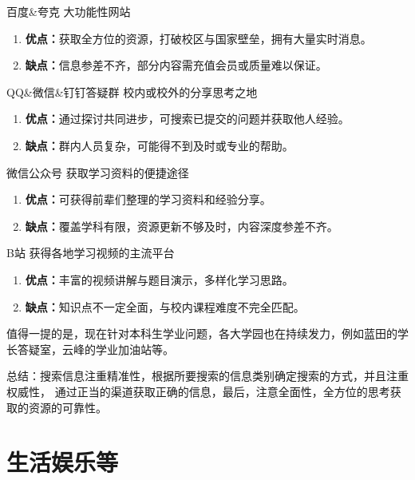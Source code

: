 \documentclass{amznotes}
\begin{document}
\begin{jqbox}{百度\&夸克}{}
    大功能性网站
    \tcblower
    \begin{enumerate}
        \item \textbf{优点：}获取全方位的资源，打破校区与国家壁垒，拥有大量实时消息。
        \item \textbf{缺点：}信息参差不齐，部分内容需充值会员或质量难以保证。
    \end{enumerate}
\end{jqbox}

\begin{jqbox}{QQ\&微信\&钉钉答疑群}{}
    校内或校外的分享思考之地
    \tcblower
    \begin{enumerate}
        \item \textbf{优点：}通过探讨共同进步，可搜索已提交的问题并获取他人经验。
        \item \textbf{缺点：}群内人员复杂，可能得不到及时或专业的帮助。
    \end{enumerate}
\end{jqbox}

\begin{jqbox}{微信公众号}{}
    获取学习资料的便捷途径
    \tcblower
    \begin{enumerate}
        \item \textbf{优点：}可获得前辈们整理的学习资料和经验分享。
        \item \textbf{缺点：}覆盖学科有限，资源更新不够及时，内容深度参差不齐。
    \end{enumerate}
\end{jqbox}

\begin{jqbox}{B站}{}
    获得各地学习视频的主流平台
    \tcblower
    \begin{enumerate}
        \item \textbf{优点：}丰富的视频讲解与题目演示，多样化学习思路。
        \item \textbf{缺点：}知识点不一定全面，与校内课程难度不完全匹配。
    \end{enumerate}
\end{jqbox}
值得一提的是，现在针对本科生学业问题，各大学园也在持续发力，例如蓝田的学长答疑室，云峰的学业加油站等。

总结：搜索信息注重精准性，根据所要搜索的信息类别确定搜索的方式，并且注重权威性，
通过正当的渠道获取正确的信息，最后，注意全面性，全方位的思考获取的资源的可靠性。

\chapter{生活娱乐等}
\end{document}
